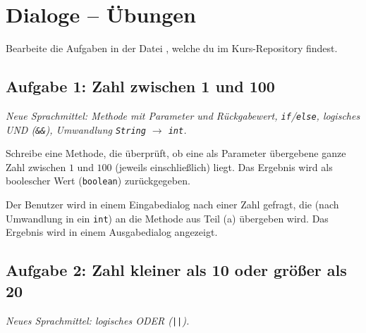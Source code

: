 \clearpage

\rehead[]{\textcolor{lightblue}{AvHG, Inf, My}}
\lohead[]{\textcolor{lightblue}{AvHG, Inf, My}}

\section{Dialoge -- Übungen}

Bearbeite die Aufgaben in der Datei , welche du im
Kurs-Repository findest.


\subsection{Aufgabe 1: Zahl zwischen 1 und 100 \tagPflicht}
\noindent \emph{Neue Sprachmittel: Methode mit Parameter und Rückgabewert,
\texttt{if}/\texttt{else}, logisches UND (\texttt{\&\&}), Umwandlung
\texttt{String} $\rightarrow$ \texttt{int}.}

\begin{compactenum}[a)]
\item Schreibe eine Methode, die überprüft, ob eine als Parameter übergebene
ganze Zahl zwischen $1$ und $100$ (jeweils einschließlich) liegt. Das Ergebnis
wird als boolescher Wert (\lstinline|boolean|) zurückgegeben.

\item Der Benutzer wird in einem Eingabedialog nach einer Zahl gefragt, die
(nach Umwandlung in ein \lstinline|int|) an die Methode aus Teil (a) übergeben
wird. Das Ergebnis wird in einem Ausgabedialog angezeigt.
\end{compactenum}


\subsection{Aufgabe 2: Zahl kleiner als 10 oder größer als 20 \tagPflicht}
\noindent \emph{Neues Sprachmittel: logisches ODER (\texttt{||}).}

